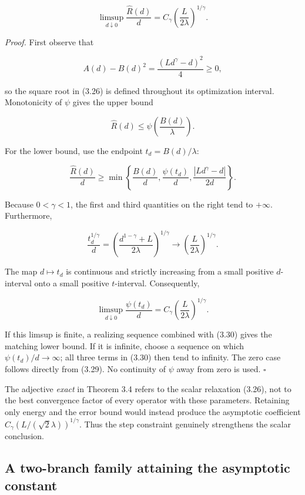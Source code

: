 \documentclass[11pt,a4paper]{article}
\theoremstyle{plain}
\theoremstyle{definition}
\theoremstyle{remark}
\begin{document}
\[
\boxed{\displaystyle
\limsup_{d\downarrow0}\frac{\widehat R(d)}{d}
=C_\gamma\left(\frac{L}{2\lambda}\right)^{1/\gamma}.}
\tag{3.27}
\]

\emph{Proof.} First observe that

\[
A(d)-B(d)^2=\frac{(Ld^\gamma-d)^2}{4}\ge0,
\tag{3.28}
\]

so the square root in (3.26) is defined throughout its optimization
interval. Monotonicity of \(\psi\) gives the upper bound

\[
\widehat R(d)\le\psi\!\left(\frac{B(d)}{\lambda}\right).
\tag{3.29}
\]

For the lower bound, use the endpoint \(t_d=B(d)/\lambda\):

\[
\frac{\widehat R(d)}{d}
\ge\min\left\{
\frac{B(d)}{d},
\frac{\psi(t_d)}{d},
\frac{|Ld^\gamma-d|}{2d}
\right\}.
\tag{3.30}
\]

Because \(0<\gamma<1\), the first and third quantities on the right tend
to \(+\infty\). Furthermore,

\[
\frac{t_d^{1/\gamma}}{d}
=\left(\frac{d^{1-\gamma}+L}{2\lambda}\right)^{1/\gamma}
\longrightarrow\left(\frac{L}{2\lambda}\right)^{1/\gamma}.
\tag{3.31}
\]

The map \(d\mapsto t_d\) is continuous and strictly increasing from a
small positive \(d\)-interval onto a small positive \(t\)-interval.
Consequently,

\[
\limsup_{d\downarrow0}\frac{\psi(t_d)}{d}
=C_\gamma\left(\frac{L}{2\lambda}\right)^{1/\gamma}.
\]

If this limsup is finite, a realizing sequence combined with (3.30)
gives the matching lower bound. If it is infinite, choose a sequence on
which \(\psi(t_d)/d\to\infty\); all three terms in (3.30) then tend to
infinity. The zero case follows directly from (3.29). No continuity of
\(\psi\) away from zero is used. \(\square\)

The adjective \emph{exact} in Theorem 3.4 refers to the scalar
relaxation (3.26), not to the best convergence factor of every operator
with these parameters. Retaining only energy and the error bound would
instead produce the asymptotic coefficient
\(C_\gamma(L/(\sqrt2\lambda))^{1/\gamma}\). Thus the step constraint
genuinely strengthens the scalar conclusion.

\hypertarget{a-two-branch-family-attaining-the-asymptotic-constant}{%
\subsection{A two-branch family attaining the asymptotic
constant}\label{a-two-branch-family-attaining-the-asymptotic-constant}}
\end{document}
